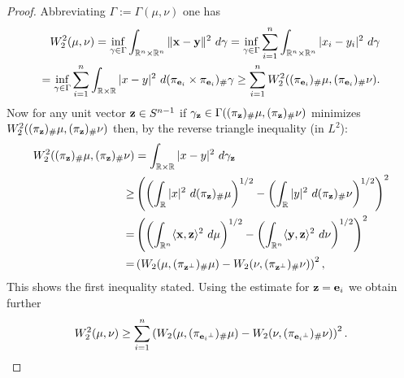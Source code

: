 \documentclass{amsart}
\numberwithin{equation}{section}
\newcommand\R{{\mathbb R}}
\theoremstyle{plain}
\theoremstyle{definition}
\begin{document}
\begin{proof}
Abbreviating $\Gamma:=\Gamma(\mu, \nu)$ one has  
\begin{equation}\label{was_proj_est} 
\begin{split}
W^2_2(\mu,\nu)=\inf_{\gamma \in \Gamma}\int_{\R^n\times \R^n} \|{\bf x}-{\bf y}\|^2\ d\gamma = \inf_{\gamma \in \Gamma}\sum^n_{i=1}\int_{\R^n\times \R^n} |x_i-y_i|^2\ d\gamma\\ = \inf_{\gamma \in \Gamma}\sum^n_{i=1} \int_{\R \times \R} |x-y|^2\ d(\pi_{{\bf e}_i} \times \pi_{{\bf e}_i})_{\#}\gamma \geq \sum^n_{i=1} W^2_2( (\pi_{{\bf e}_i})_{\#}\mu, (\pi_{{\bf e}_i})_{\#}\nu).
\end{split}
\end{equation}
Now for any unit vector ${\bf z} \in S^{n-1}$ if $\gamma_{{\bf z}} \in \Gamma ( (\pi_{{\bf z}})_{\#}\mu, (\pi_{{\bf z}})_{\#}\nu)$ minimizes $W^2_2( (\pi_{{\bf z}})_{\#}\mu, (\pi_{{\bf z}})_{\#}\nu)$  then, by the reverse triangle inequality (in $L^2$): 
\begin{equation}\label{was_ltwo_est}
\begin{split} W^2_2( (\pi_{{\bf z}})_{\#}\mu, (\pi_{{\bf z}})_{\#}\nu)& =\int_{\R \times \R} |x-y|^2 \  d\gamma_{{\bf z}}\\
 \geq & \left(\left(\int_{\R} |x|^2\ d(\pi_{{\bf z}})_{\#}\mu\right)^{1/2} - \left(\int_{\R} |y|^2\ d (\pi_{{\bf z}})_{\#}\nu\right)^{1/2}\right)^{2}\\
=& \left(\left(\int_{\R^n} \langle {\bf x},{\bf z} \rangle^2\ d\mu\right)^{1/2} - \left(\int_{\R^n} \langle {\bf y},{\bf z} \rangle^2 \ d \nu\right)^{1/2}\right)^{2}\\
=& \left(W_2(\mu, (\pi_{{{\bf z}}^{\perp}})_{\#}\mu) - W_2(\nu, (\pi_{{{\bf z}}^{\perp}})_{\#}\nu) \right)^{2}, 
\end{split}
\end{equation}
This shows the first inequality stated. Using the estimate for ${\bf z}={\bf e}_i$ we obtain further 
\[W^2_2(\mu,\nu)\geq \sum^n_{i=1}\left(W_2(\mu, (\pi_{{{\bf e}_i}^{\perp}})_{\#}\mu) - W_2(\nu, (\pi_{{{\bf e}_i}^{\perp}})_{\#}\nu) \right)^{2}.   \]
 

\end{proof}
\end{document}

